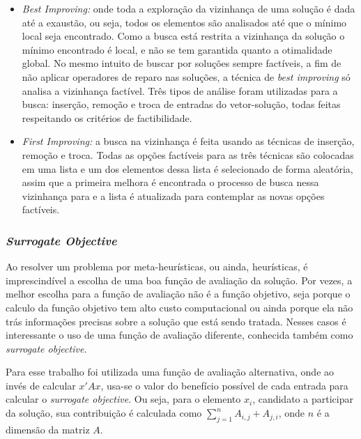 \documentclass[12pt,a4paper]{article}
\begin{document}
        \begin{itemize}

        \item {\it Best Improving:} onde toda a exploração da vizinhança de uma solução é dada até a exaustão, ou seja, todos os elementos são analisados até que o mínimo local seja encontrado. Como
            a busca está restrita a vizinhança da solução o mínimo encontrado é local, e não se tem garantida quanto a otimalidade global. No mesmo intuito de buscar por soluções sempre factíveis, a
                fim de não aplicar operadores de reparo nas soluções, a técnica de {\it best improving} só analisa a vizinhança factível. Três tipos de análise foram utilizadas para a busca:
                inserção, remoção e troca de entradas do vetor-solução, todas feitas respeitando os critérios de factibilidade. 

        \item {\it First Improving:} a busca na vizinhança é feita usando as técnicas de inserção, remoção e troca. Todas as opções factíveis para as três técnicas são colocadas em uma lista
        e um dos elementos dessa lista é selecionado de forma aleatória, assim que a primeira melhora é encontrada o processo de busca nessa vizinhança para e a lista é atualizada para
        contemplar as novas opções factíveis. 
        \end{itemize}

    \subsubsection{\it Surrogate Objective} 

        Ao resolver um problema por meta-heurísticas, ou ainda, heurísticas, é imprescindível a escolha de uma boa função de avaliação da solução. Por vezes, a melhor escolha para a função de
        avaliação não é a função objetivo, seja porque o calculo da  função objetivo tem alto custo computacional ou ainda porque ela não trás informações precisas sobre a solução que está sendo
        tratada. Nesses casos é interessante o uso de uma função de avaliação diferente, conhecida também como {\it surrogate objective}.

        Para esse trabalho foi utilizada uma função de avaliação alternativa, onde ao invés de calcular $x'Ax$, usa-se o valor do benefício possível de cada entrada para calcular o {\it surrogate
        objective}. Ou seja, para o elemento $x_i$, candidato a participar da solução, sua contribuição é calculada como $\sum_{j=1}^n A_{i,j}+A_{j,i}$, onde $n$ é a dimensão da matriz $A$.
\end{document}
